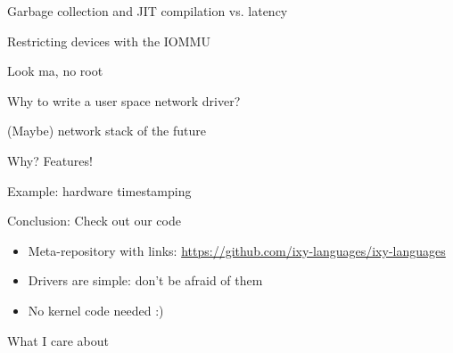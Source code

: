 \documentclass[NET,english,aspectratio=169,notitleframe]{tumbeamer}
\begin{document}
\begin{frame}{Garbage collection and JIT compilation vs. latency}
\end{frame}


\begin{frame}{Restricting devices with the IOMMU}
\end{frame}

\begin{frame}{Look ma, no root}
\end{frame}


\begin{frame}{Why to write a user space network driver?}
\end{frame}

\begin{frame}{(Maybe) network stack of the future}
\end{frame}

\begin{frame}{Why? Features!}
\end{frame}

\begin{frame}{Example: hardware timestamping}
\end{frame}


\begin{frame}{Conclusion: Check out our code}
\begin{itemize}
\item Meta-repository with links: \url{https://github.com/ixy-languages/ixy-languages}
\item Drivers are simple: don't be afraid of them
\item No kernel code needed :)
\end{itemize}
\end{frame}













\begin{frame}{What I care about}
\centering{}
\end{frame}
\end{document}
